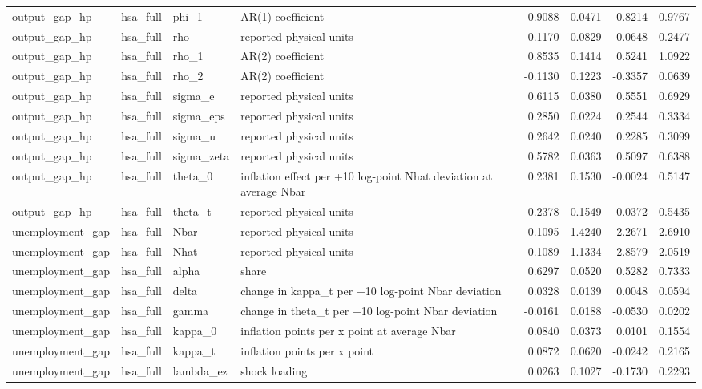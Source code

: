 \begin{tabular}{llllrrrr}
output\_gap\_hp & hsa\_full & phi\_1 & AR(1) coefficient & 0.9088 & 0.0471 & 0.8214 & 0.9767 \\
output\_gap\_hp & hsa\_full & rho & reported physical units & 0.1170 & 0.0829 & -0.0648 & 0.2477 \\
output\_gap\_hp & hsa\_full & rho\_1 & AR(2) coefficient & 0.8535 & 0.1414 & 0.5241 & 1.0922 \\
output\_gap\_hp & hsa\_full & rho\_2 & AR(2) coefficient & -0.1130 & 0.1223 & -0.3357 & 0.0639 \\
output\_gap\_hp & hsa\_full & sigma\_e & reported physical units & 0.6115 & 0.0380 & 0.5551 & 0.6929 \\
output\_gap\_hp & hsa\_full & sigma\_eps & reported physical units & 0.2850 & 0.0224 & 0.2544 & 0.3334 \\
output\_gap\_hp & hsa\_full & sigma\_u & reported physical units & 0.2642 & 0.0240 & 0.2285 & 0.3099 \\
output\_gap\_hp & hsa\_full & sigma\_zeta & reported physical units & 0.5782 & 0.0363 & 0.5097 & 0.6388 \\
output\_gap\_hp & hsa\_full & theta\_0 & inflation effect per +10 log-point Nhat deviation at average Nbar & 0.2381 & 0.1530 & -0.0024 & 0.5147 \\
output\_gap\_hp & hsa\_full & theta\_t & reported physical units & 0.2378 & 0.1549 & -0.0372 & 0.5435 \\
unemployment\_gap & hsa\_full & Nbar & reported physical units & 0.1095 & 1.4240 & -2.2671 & 2.6910 \\
unemployment\_gap & hsa\_full & Nhat & reported physical units & -0.1089 & 1.1334 & -2.8579 & 2.0519 \\
unemployment\_gap & hsa\_full & alpha & share & 0.6297 & 0.0520 & 0.5282 & 0.7333 \\
unemployment\_gap & hsa\_full & delta & change in kappa\_t per +10 log-point Nbar deviation & 0.0328 & 0.0139 & 0.0048 & 0.0594 \\
unemployment\_gap & hsa\_full & gamma & change in theta\_t per +10 log-point Nbar deviation & -0.0161 & 0.0188 & -0.0530 & 0.0202 \\
unemployment\_gap & hsa\_full & kappa\_0 & inflation points per x point at average Nbar & 0.0840 & 0.0373 & 0.0101 & 0.1554 \\
unemployment\_gap & hsa\_full & kappa\_t & inflation points per x point & 0.0872 & 0.0620 & -0.0242 & 0.2165 \\
unemployment\_gap & hsa\_full & lambda\_ez & shock loading & 0.0263 & 0.1027 & -0.1730 & 0.2293 \\

\end{tabular}

